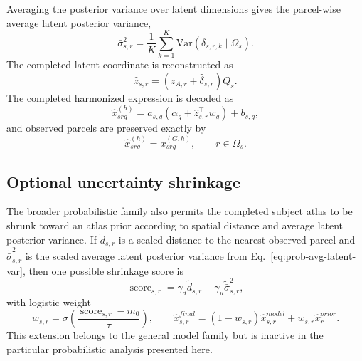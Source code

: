\documentclass[11pt]{article}
\numberwithin{equation}{section}
\begin{document}
Averaging the posterior variance over latent dimensions gives the parcel-wise average
latent posterior variance,
\begin{equation}
  \label{eq:prob-avg-latent-var}
  \bar{\sigma}_{s,r}^{2}
  =
  \frac{1}{K}
  \sum_{k=1}^{K}
  \mathrm{Var}\!\left(
  \delta_{s,r,k}\mid \Omega_s
  \right).
\end{equation}
The completed latent coordinate is reconstructed as
\begin{equation}
  \label{eq:prob-completed-latent}
  \hat{z}_{s,r}
  =
  \left(
  z_{A,r} + \hat{\delta}_{s,r}
  \right)Q_s.
\end{equation}
The completed harmonized expression is decoded as
\begin{equation}
  \label{eq:prob-final-decode}
  \hat{x}_{srg}^{(h)}
  =
  a_{s,g}\!\left(
  \alpha_g + \hat{z}_{s,r}^\top w_g
  \right)
  +
  b_{s,g},
\end{equation}
and observed parcels are preserved exactly by
\begin{equation}
  \label{eq:prob-overwrite}
  \hat{x}_{srg}^{(h)} = x_{srg}^{(G,h)}, \qquad r\in\Omega_s.
\end{equation}

\subsection{Optional uncertainty shrinkage}
The broader probabilistic family also permits the completed subject atlas to be
shrunk toward an atlas prior according to spatial distance and average latent posterior
variance.  If $\tilde{d}_{s,r}$ is a scaled distance to the nearest observed parcel
and $\widetilde{\bar{\sigma}}_{s,r}^{2}$ is the scaled average latent posterior
variance from Eq.~\eqref{eq:prob-avg-latent-var}, then one possible shrinkage score is
\[
  \operatorname{score}_{s,r}
  =
  \gamma_d \tilde{d}_{s,r}
  +
  \gamma_u \widetilde{\bar{\sigma}}_{s,r}^{2},
\]
with logistic weight
\[
  w_{s,r}
  =
  \sigma\!\left(
  \frac{\operatorname{score}_{s,r}-m_0}{\tau}
  \right),
  \qquad
  \hat{x}_{s,r}^{final}
  =
  (1-w_{s,r})\hat{x}_{s,r}^{model}
  +
  w_{s,r}\hat{x}_{r}^{prior}.
\]
This extension belongs to the general model family but is inactive in the particular
probabilistic analysis presented here.
\end{document}
